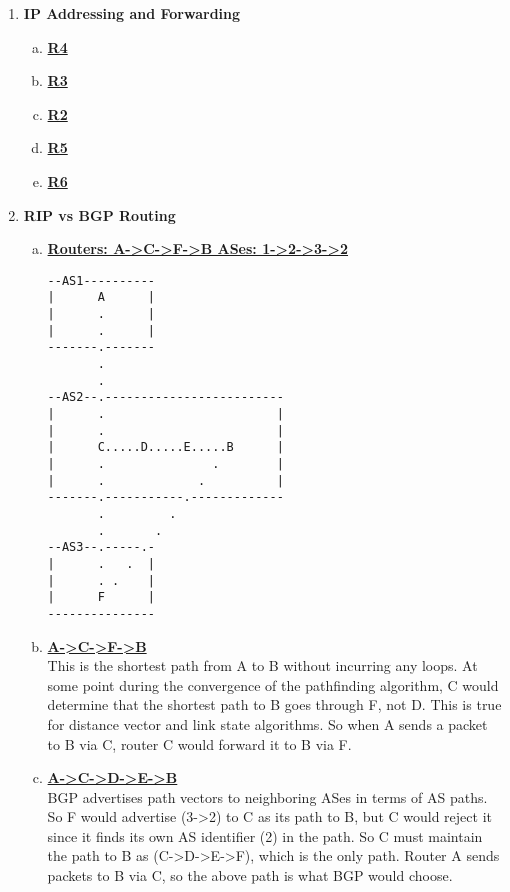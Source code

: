 \documentclass[11pt,fleqn]{article}
\begin{document}
\begin{enumerate}[1.]

\item  \textbf{IP Addressing and Forwarding}
\begin{enumerate}[(a)]
\item \textbf{\underline{R4}}
\item \textbf{\underline{R3}}
\item \textbf{\underline{R2}}
\item \textbf{\underline{R5}}
\item \textbf{\underline{R6}}
\end{enumerate}

\newpage
\item  \textbf{RIP vs BGP Routing}
\begin{enumerate}[(a)]
\item \textbf{\underline{Routers: A->C->F->B \qquad ASes: 1->2->3->2}}
\begin{verbatim}
--AS1----------
|      A      |
|      .      |
|      .      |
-------.-------
       .
       .
--AS2--.-------------------------
|      .                        |
|      .                        |
|      C.....D.....E.....B      |
|      .               .        |
|      .             .          |
-------.-----------.-------------
       .         .
       .       .
--AS3--.-----.-
|      .   .  |
|      . .    |
|      F      |
---------------
\end{verbatim}
\item \textbf{\underline{A->C->F->B}} \\
This is the shortest path from A to B without incurring any loops. At some point during the convergence of the pathfinding algorithm, C would determine that the shortest path to B goes through F, not D. This is true for distance vector and link state algorithms. So when A sends a packet to B via C, router C would forward it to B via F.
\item \textbf{\underline{A->C->D->E->B}} \\
BGP advertises path vectors to neighboring ASes in terms of AS paths. So F would advertise (3->2) to C as its path to B, but C would reject it since it finds its own AS identifier (2) in the path. So C must maintain the path to B as (C->D->E->F), which is the only path. Router A sends packets to B via C, so the above path is what BGP would choose.
\end{enumerate}


\end{enumerate}
\end{document}

